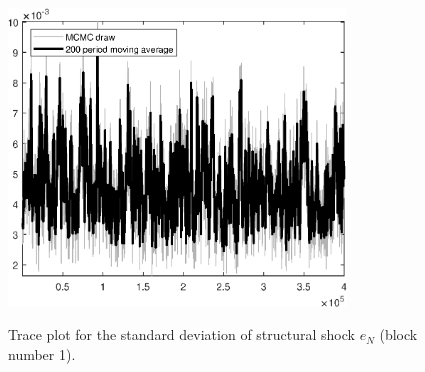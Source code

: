\begin{figure}[H]
\centering
  \includegraphics[width=0.8\textwidth]{BRS_growth/graphs/TracePlot_SE_e_N_blck_1}\\
    \caption{Trace plot for the standard deviation of structural shock ${e_N}$ (block number 1).}
\end{figure}

